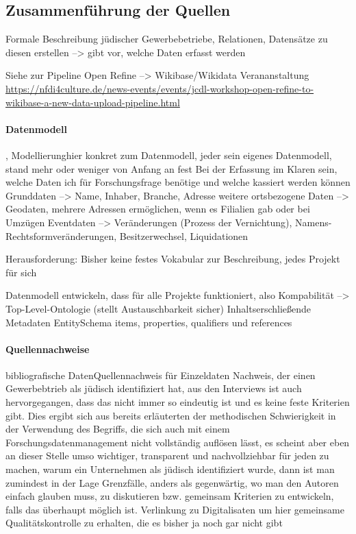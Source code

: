 \subsection{Zusammenführung der Quellen}
Formale Beschreibung jüdischer Gewerbebetriebe, Relationen, Datensätze zu diesen erstellen --> gibt vor, welche Daten erfasst werden

Siehe zur Pipeline Open Refine --> Wikibase/Wikidata Verananstaltung \url{https://nfdi4culture.de/news-events/events/jcdl-workshop-open-refine-to-wikibase-a-new-data-upload-pipeline.html}
\paragraph{Datenmodell}, Modellierunghier konkret zum Datenmodell, jeder sein eigenes Datenmodell, stand mehr oder weniger von Anfang an fest
Bei der Erfassung im Klaren sein, welche Daten ich für Forschungsfrage benötige und welche kassiert werden können
Grunddaten --> Name, Inhaber, Branche, Adresse
weitere ortsbezogene Daten --> Geodaten, mehrere Adressen ermöglichen, wenn es Filialien gab oder bei Umzügen
Eventdaten --> Veränderungen (Prozess der Vernichtung), Namens-Rechtsformveränderungen, Besitzerwechsel, Liquidationen

Herausforderung: Bisher keine festes Vokabular zur Beschreibung, jedes Projekt für sich 

Datenmodell entwickeln, dass für alle Projekte funktioniert, also 
Kompabilität --> Top-Level-Ontologie (stellt Austauschbarkeit sicher)
Inhaltserschließende Metadaten
EntitySchema items, properties, qualifiers und references
\paragraph{Quellennachweise}
bibliografische DatenQuellennachweis für Einzeldaten
Nachweis, der einen Gewerbebtrieb als jüdisch identifiziert hat, aus den Interviews ist auch hervorgegangen, dass das nicht immer so eindeutig ist und es keine feste Kriterien gibt. Dies ergibt sich aus bereits erläuterten der methodischen Schwierigkeit in der Verwendung des Begriffs, die sich auch mit einem Forschungsdatenmanagement nicht vollständig auflösen lässt, es scheint aber eben an dieser Stelle umso wichtiger, transparent und nachvollziehbar für jeden zu machen, warum ein Unternehmen als jüdisch identifiziert wurde, dann ist man zumindest in der Lage Grenzfälle, anders als gegenwärtig, wo man den Autoren einfach glauben muss, zu diskutieren bzw. gemeinsam Kriterien zu entwickeln, falls das überhaupt möglich ist.
Verlinkung zu Digitalisaten um hier gemeinsame Qualitätskontrolle zu erhalten, die es bisher ja noch gar nicht gibt

